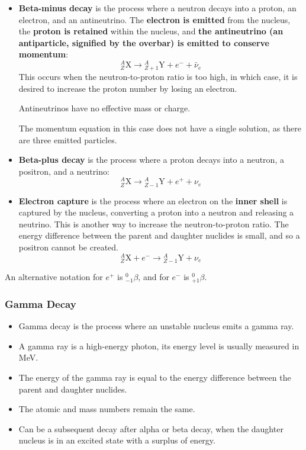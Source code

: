 \documentclass[a4paper,12pt]{article}
\newcommand{\atom}[3]{{}^{#1}_{#2}\text{#3}}
\begin{document}
\begin{itemize}
  \item \textbf{Beta-minus decay} is the process where a neutron decays into a proton, an electron, and an antineutrino. The \textbf{electron is emitted} from the nucleus, the \textbf{proton is retained} within the nucleus, and \textbf{the antineutrino (an antiparticle, signified by the overbar) is emitted to conserve momentum}:
        \[
          \atom{A}{Z}{X} \rightarrow \atom{A}{Z+1}{Y} + e^- + \bar{\nu}_e
        \]
        This occurs when the neutron-to-proton ratio is too high, in which case, it is desired to increase the proton number by losing an electron.

        Antineutrinos have no effective mass or charge.

        The momentum equation in this case does not have a single solution, as there are three emitted particles.
  \item \textbf{Beta-plus decay} is the process where a proton decays into a neutron, a positron, and a neutrino:
        \[
          \atom{A}{Z}{X} \rightarrow \atom{A}{Z-1}{Y} + e^+ + \nu_e
        \]
  \item \textbf{Electron capture} is the process where an electron on the \textbf{inner shell} is captured by the nucleus, converting a proton into a neutron and releasing a neutrino. This is another way to increase the neutron-to-proton ratio. The energy difference between the parent and daughter nuclides is small, and so a positron cannot be created.
        \[
          \atom{A}{Z}{X} + e^- \rightarrow \atom{A}{Z-1}{Y} + \nu_e
        \]
\end{itemize}

An alternative notation for $e^+$ is $\atom{0}{-1}{$\beta$}$, and for $e^-$ is $\atom{0}{+1}{$\beta$}$.

\pagebreak

\subsubsection{Gamma Decay}

\begin{itemize}
  \item Gamma decay is the process where an unstable nucleus emits a gamma ray.
  \item A gamma ray is a high-energy photon, its energy level is usually measured in MeV.
  \item The energy of the gamma ray is equal to the energy difference between the parent and daughter nuclides.
  \item The atomic and mass numbers remain the same.
  \item Can be a subsequent decay after alpha or beta decay, when the daughter nucleus is in an excited state with a surplus of energy.
\end{itemize}
\end{document}
